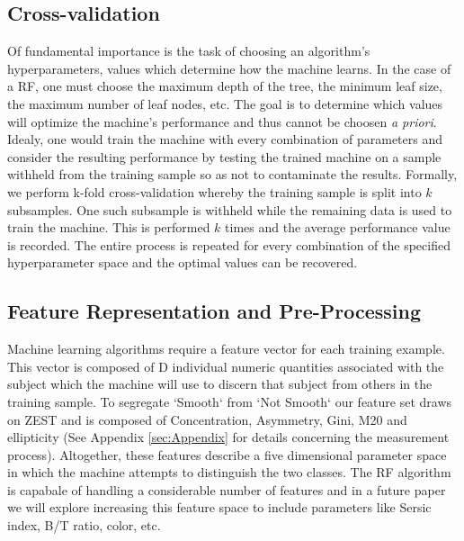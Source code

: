 \documentclass[twocolumn]{aastex6}
\begin{document}
\subsection{Cross-validation}
Of fundamental importance is the task of choosing an algorithm's hyperparameters, 
values which determine how the machine learns.  In the case of a RF, one must 
choose the maximum depth of the tree, the minimum leaf size, the maximum
number of leaf nodes, etc. The goal is to determine which values will optimize 
the machine's performance and thus cannot be choosen \textit{a priori}. 
Idealy, one would train the machine with every combination of parameters and 
consider the resulting performance by testing the trained machine on a sample
withheld from the training sample so as not to contaminate the results. 
Formally, we perform k-fold cross-validation whereby the training sample is split
into $k$ subsamples. One such subsample is withheld while the remaining data is
used to train the machine. This is performed $k$ times and the average performance
value is recorded. The entire process is repeated for every combination of the 
specified hyperparameter space and the optimal values can be recovered. 

 
\subsection{Feature Representation and Pre-Processing}
Machine learning algorithms require a feature vector for each training example. 
This vector is composed of D individual numeric quantities associated with the 
subject which the machine will use to discern that subject from others in the 
training sample. To segregate `Smooth` from `Not Smooth` our feature set draws 
on ZEST \citep{Scarlata2007} and  is composed of Concentration, Asymmetry, Gini, 
M20 and ellipticity (See Appendix \ref{sec:Appendix} for details concerning the 
measurement process). Altogether, these features describe a five dimensional 
parameter space in which the machine attempts to distinguish the two classes. 
The RF algorithm is capabale of handling a considerable number of features and in
a future paper we will explore increasing this feature space to include parameters
like Sersic index, B/T ratio, color, etc. 

\end{document}

